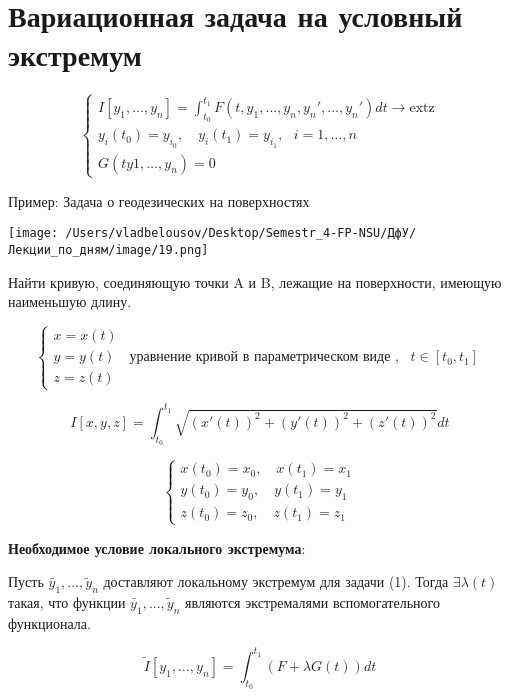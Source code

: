 \documentclass[12pt, a4paper]{report}
\begin{document}
\fi


\section{Вариационная задача на условный экстремум}

\[ \begin{cases}
    I [y_1, \ldots, y_n]  = \int_{t_0 }^{t_1 }F(t,y_1, \ldots, y_n, y_n ',..., y_n')dt \to  \mathrm{extz}\\
    y_i (t_0 ) = y_{i_0}, \quad y_i (t_1 ) = y_{i_1} , \text{ }  i =1, \ldots, n\\
    G(ty1, \ldots, y_n) = 0
\end{cases} \] 

Пример: Задача о геодезических на поверхностях

\begin{center}
    \texttt{[image: /Users/vladbelousov/Desktop/Semestr\_4-FP-NSU/ДфУ/Лекции\_по\_дням/image/19.png]}
\end{center}

Найти кривую, соединяющую точки A и B, лежащие на поверхности, имеющую наименьшую длину. 

\[ \begin{cases}
x = x(t ) \\
y = y(t ) \quad  \text{уравнение кривой в параметрическом виде } ,\text{ }  t \in [t_0 , t_1]\\
z = z(t )
\end{cases} \] 

\[ I [x,y,z]  = \int_{t_0}^{t_1} \sqrt{(x' (t )) ^2 + (y' (t )) ^2 + (z' (t )) ^2 }dt \] 

\[\begin{cases}
x(t_0 ) = x_0 ,\quad x(t_1 ) = x_1 \\
y(t_0 ) = y_0 ,\quad y(t_1 ) = y_1 \\
z(t_0 ) = z_0 ,\quad z(t_1 ) = z_1
\end{cases} \] 

\textbf{Необходимое условие локального экстремума}:

Пусть \( \tilde{y_1 }, ..., \tilde{y }_n  \)  доставляют локальному экстремум для задачи (1). Тогда \( \exists    \lambda(t)   \) такая, что функции \( \tilde{y_1 }, ..., \tilde{y }_n  \) являются экстремалями вспомогательного функционала. 

\[ \tilde{I } [y_1, \ldots, y_n ] = \int_{t_0}^{t_1} (F + \lambda G(t))dt  \] 
\end{document}
